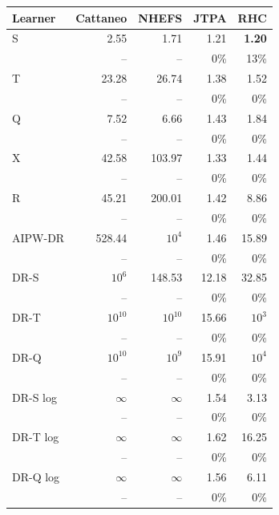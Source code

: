 \begin{tabular}{l|rrrr}
\hline
Learner & Cattaneo & NHEFS & JTPA & RHC \\
\hline
S & 2.55 & 1.71 & 1.21 & \textbf{1.20} \\
 & \scriptsize -- & \scriptsize -- & \scriptsize 0\% & \scriptsize 13\% \\[2pt]
T & 23.28 & 26.74 & 1.38 & 1.52 \\
 & \scriptsize -- & \scriptsize -- & \scriptsize 0\% & \scriptsize 0\% \\[2pt]
\hline
Q & 7.52 & 6.66 & 1.43 & 1.84 \\
 & \scriptsize -- & \scriptsize -- & \scriptsize 0\% & \scriptsize 0\% \\[2pt]
\hline
X & 42.58 & 103.97 & 1.33 & 1.44 \\
 & \scriptsize -- & \scriptsize -- & \scriptsize 0\% & \scriptsize 0\% \\[2pt]
R & 45.21 & 200.01 & 1.42 & 8.86 \\
 & \scriptsize -- & \scriptsize -- & \scriptsize 0\% & \scriptsize 0\% \\[2pt]
AIPW-DR & 528.44 & $10^{4}$ & 1.46 & 15.89 \\
 & \scriptsize -- & \scriptsize -- & \scriptsize 0\% & \scriptsize 0\% \\[2pt]
\hline
DR-S & $10^{6}$ & 148.53 & 12.18 & 32.85 \\
 & \scriptsize -- & \scriptsize -- & \scriptsize 0\% & \scriptsize 0\% \\[2pt]
DR-T & $10^{10}$ & $10^{10}$ & 15.66 & $10^{3}$ \\
 & \scriptsize -- & \scriptsize -- & \scriptsize 0\% & \scriptsize 0\% \\[2pt]
DR-Q & $10^{10}$ & $10^{9}$ & 15.91 & $10^{4}$ \\
 & \scriptsize -- & \scriptsize -- & \scriptsize 0\% & \scriptsize 0\% \\[2pt]
\hline
DR-S log & $\infty$ & $\infty$ & 1.54 & 3.13 \\
 & \scriptsize -- & \scriptsize -- & \scriptsize 0\% & \scriptsize 0\% \\[2pt]
DR-T log & $\infty$ & $\infty$ & 1.62 & 16.25 \\
 & \scriptsize -- & \scriptsize -- & \scriptsize 0\% & \scriptsize 0\% \\[2pt]
DR-Q log & $\infty$ & $\infty$ & 1.56 & 6.11 \\
 & \scriptsize -- & \scriptsize -- & \scriptsize 0\% & \scriptsize 0\% \\[2pt]

\end{tabular}
